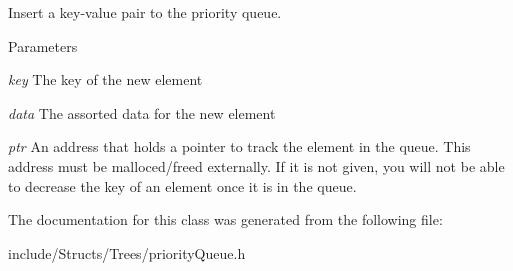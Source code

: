 Insert a key-\/value pair to the priority queue. 


\begin{DoxyParams}{Parameters}
\item[{\em key}]The key of the new element \item[{\em data}]The assorted data for the new element \item[{\em ptr}]An address that holds a pointer to track the element in the queue. This address must be malloced/freed externally. If it is not given, you will not be able to decrease the key of an element once it is in the queue. \end{DoxyParams}


The documentation for this class was generated from the following file:\begin{DoxyCompactItemize}
\item 
include/Structs/Trees/priorityQueue.h\end{DoxyCompactItemize}
